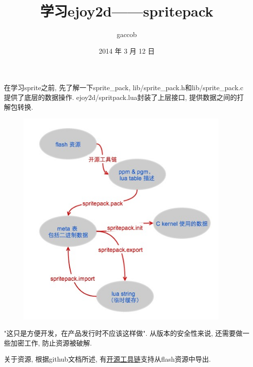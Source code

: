 

\title {\ZHH \huge 学习ejoy2d——spritepack}
\author {\small gaccob}
\date {\small 2014 年 3 月 12 日}
\maketitle

{在学习sprite之前, 先了解一下sprite\_pack, lib/sprite\_pack.h和lib/sprite\_pack.c提供了底层的数据操作. ejoy2d/spritpack.lua封装了上层接口, 提供数据之间的打解包转换.}\par

\begin {figure}[htbp]
    \centering
    \includegraphics [width=300pt, keepaspectratio] {sprite_pack.jpg}
\end {figure}

{"这只是方便开发，在产品发行时不应该这样做". 从版本的安全性来说, 还需要做一些加密工作, 防止资源被破解. }\par

{关于资源, 根据github文档所述, 有\href{https://github.com/robinxb/flash-parser}{开源工具链}支持从flash资源中导出. }\par

